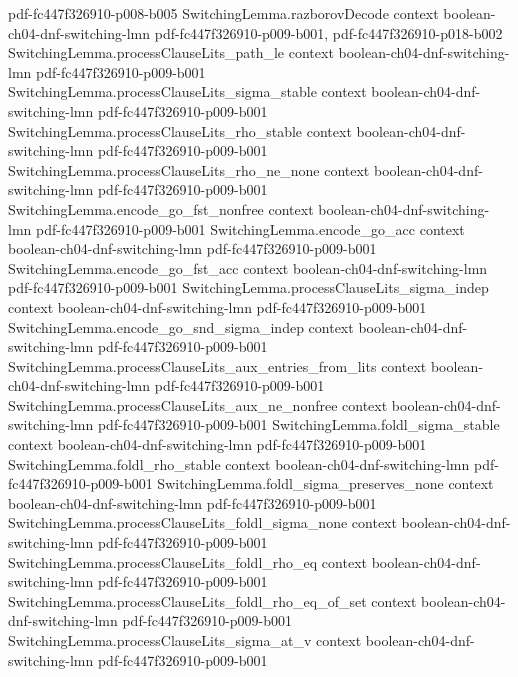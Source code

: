 \begin{lemma}
{    pdf-fc447f326910-p008-b005}
\proofstep
  {SwitchingLemma.razborovDecode}
  {context}
  {boolean-ch04-dnf-switching-lmn}
  {pdf-fc447f326910-p009-b001,
    pdf-fc447f326910-p018-b002}
\proofstep
  {SwitchingLemma.processClauseLits_path_le}
  {context}
  {boolean-ch04-dnf-switching-lmn}
  {pdf-fc447f326910-p009-b001}
\proofstep
  {SwitchingLemma.processClauseLits_sigma_stable}
  {context}
  {boolean-ch04-dnf-switching-lmn}
  {pdf-fc447f326910-p009-b001}
\proofstep
  {SwitchingLemma.processClauseLits_rho_stable}
  {context}
  {boolean-ch04-dnf-switching-lmn}
  {pdf-fc447f326910-p009-b001}
\proofstep
  {SwitchingLemma.processClauseLits_rho_ne_none}
  {context}
  {boolean-ch04-dnf-switching-lmn}
  {pdf-fc447f326910-p009-b001}
\proofstep
  {SwitchingLemma.encode_go_fst_nonfree}
  {context}
  {boolean-ch04-dnf-switching-lmn}
  {pdf-fc447f326910-p009-b001}
\proofstep
  {SwitchingLemma.encode_go_acc}
  {context}
  {boolean-ch04-dnf-switching-lmn}
  {pdf-fc447f326910-p009-b001}
\proofstep
  {SwitchingLemma.encode_go_fst_acc}
  {context}
  {boolean-ch04-dnf-switching-lmn}
  {pdf-fc447f326910-p009-b001}
\proofstep
  {SwitchingLemma.processClauseLits_sigma_indep}
  {context}
  {boolean-ch04-dnf-switching-lmn}
  {pdf-fc447f326910-p009-b001}
\proofstep
  {SwitchingLemma.encode_go_snd_sigma_indep}
  {context}
  {boolean-ch04-dnf-switching-lmn}
  {pdf-fc447f326910-p009-b001}
\proofstep
  {SwitchingLemma.processClauseLits_aux_entries_from_lits}
  {context}
  {boolean-ch04-dnf-switching-lmn}
  {pdf-fc447f326910-p009-b001}
\proofstep
  {SwitchingLemma.processClauseLits_aux_ne_nonfree}
  {context}
  {boolean-ch04-dnf-switching-lmn}
  {pdf-fc447f326910-p009-b001}
\proofstep
  {SwitchingLemma.foldl_sigma_stable}
  {context}
  {boolean-ch04-dnf-switching-lmn}
  {pdf-fc447f326910-p009-b001}
\proofstep
  {SwitchingLemma.foldl_rho_stable}
  {context}
  {boolean-ch04-dnf-switching-lmn}
  {pdf-fc447f326910-p009-b001}
\proofstep
  {SwitchingLemma.foldl_sigma_preserves_none}
  {context}
  {boolean-ch04-dnf-switching-lmn}
  {pdf-fc447f326910-p009-b001}
\proofstep
  {SwitchingLemma.processClauseLits_foldl_sigma_none}
  {context}
  {boolean-ch04-dnf-switching-lmn}
  {pdf-fc447f326910-p009-b001}
\proofstep
  {SwitchingLemma.processClauseLits_foldl_rho_eq}
  {context}
  {boolean-ch04-dnf-switching-lmn}
  {pdf-fc447f326910-p009-b001}
\proofstep
  {SwitchingLemma.processClauseLits_foldl_rho_eq_of_set}
  {context}
  {boolean-ch04-dnf-switching-lmn}
  {pdf-fc447f326910-p009-b001}
\proofstep
  {SwitchingLemma.processClauseLits_sigma_at_v}
  {context}
  {boolean-ch04-dnf-switching-lmn}
  {pdf-fc447f326910-p009-b001}

\end{lemma}
